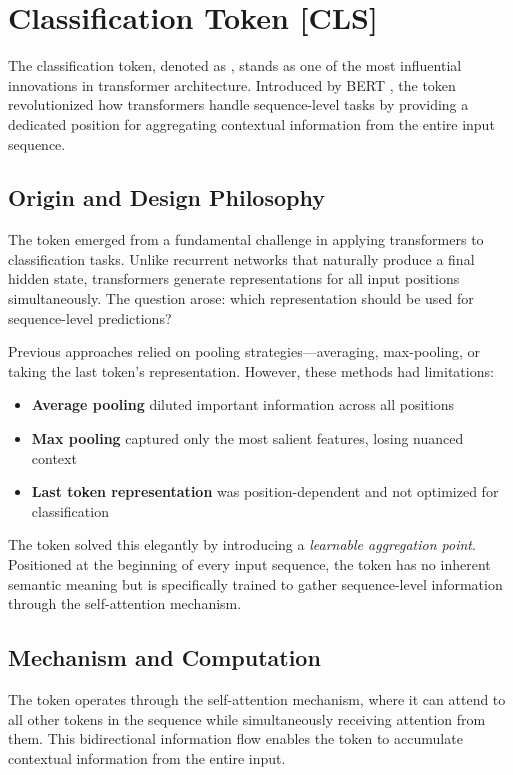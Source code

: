 \section{Classification Token [CLS]}

The classification token, denoted as \cls{}, stands as one of the most influential innovations in transformer architecture. Introduced by BERT \citep{devlin2018bert}, the \cls{} token revolutionized how transformers handle sequence-level tasks by providing a dedicated position for aggregating contextual information from the entire input sequence.

\subsection{Origin and Design Philosophy}

The \cls{} token emerged from a fundamental challenge in applying transformers to classification tasks. Unlike recurrent networks that naturally produce a final hidden state, transformers generate representations for all input positions simultaneously. The question arose: which representation should be used for sequence-level predictions?

Previous approaches relied on pooling strategies---averaging, max-pooling, or taking the last token's representation. However, these methods had limitations:

\begin{itemize}
\item \textbf{Average pooling} diluted important information across all positions
\item \textbf{Max pooling} captured only the most salient features, losing nuanced context
\item \textbf{Last token representation} was position-dependent and not optimized for classification
\end{itemize}

The \cls{} token solved this elegantly by introducing a \emph{learnable aggregation point}. Positioned at the beginning of every input sequence, the \cls{} token has no inherent semantic meaning but is specifically trained to gather sequence-level information through the self-attention mechanism.

\subsection{Mechanism and Computation}

The \cls{} token operates through the self-attention mechanism, where it can attend to all other tokens in the sequence while simultaneously receiving attention from them. This bidirectional information flow enables the \cls{} token to accumulate contextual information from the entire input.

